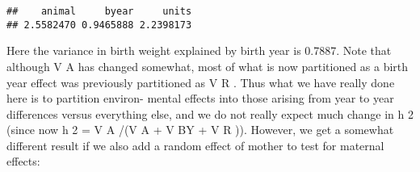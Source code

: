 \documentclass[
  12pt,
]{book}
\newenvironment{Shaded}{\begin{snugshade}}{\end{snugshade}}
\newcommand{\AttributeTok}[1]{\textcolor[rgb]{0.77,0.63,0.00}{#1}}
\newcommand{\ConstantTok}[1]{\textcolor[rgb]{0.00,0.00,0.00}{#1}}
\newcommand{\DecValTok}[1]{\textcolor[rgb]{0.00,0.00,0.81}{#1}}
\newcommand{\FloatTok}[1]{\textcolor[rgb]{0.00,0.00,0.81}{#1}}
\newcommand{\FunctionTok}[1]{\textcolor[rgb]{0.00,0.00,0.00}{#1}}
\newcommand{\NormalTok}[1]{#1}
\newcommand{\OtherTok}[1]{\textcolor[rgb]{0.56,0.35,0.01}{#1}}
\newcommand{\SpecialCharTok}[1]{\textcolor[rgb]{0.00,0.00,0.00}{#1}}
\begin{document}
\begin{Shaded}
\end{Shaded}

\begin{verbatim}
##    animal     byear     units 
## 2.5582470 0.9465888 2.2398173
\end{verbatim}

Here the variance in birth weight explained by birth year is 0.7887. Note that although V A has changed somewhat, most of what is now partitioned as a birth year effect was previously partitioned as V R . Thus what we have really done here is to partition environ- mental effects into those arising from year to year differences versus everything else, and we do not really expect much change in h 2 (since now h 2 = V A /(V A + V BY + V R )). However, we get a somewhat different result if we also add a random effect of mother to test for maternal effects:
\end{document}
